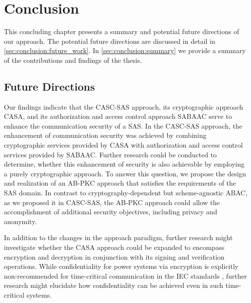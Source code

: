 \chapter{Conclusion}
\label{ch:conclusion}
This concluding chapter presents a summary and potential future directions of our approach.
The potential future directions are discussed in detail in \autoref{sec:conclusion:future_work}.
In \autoref{sec:conclusion:summary} we provide a summary of the contributions and findings of the thesis.

\section{Future Directions}
\label{sec:conclusion:future_work}
Our findings indicate that the CASC-SAS approach, its cryptographic approach CASA, and its authorization and access control approach SABAAC serve to enhance the communication security of a SAS.
In the CASC-SAS approach, the enhancement of communication security was achieved by combining cryptographic services provided by CASA with authorization and access control services provided by SABAAC.
Further research could be conducted to determine, whether this enhancement of security is also achievable by employing a purely cryptographic approach.
To answer this question, we propose the design and realization of an AB-PKC approach that satisfies the requirements of the SAS domain.
In contrast to cryptography-dependent but scheme-agnostic ABAC, as we proposed it in CASC-SAS, the AB-PKC approach could allow the accomplishment of additional security objectives, including privacy and anonymity.

In addition to the changes in the approach paradigm, further research might investigate whether the CASA approach could be expanded to encompass encryption and decryption in conjunction with its signing and verification operations.
While confidentiality for power systems via encryption is explicitly non-recommended for time-critical communication in the IEC standards \cite{IEC62351P6}, further research might elucidate how confidentiality can be achieved even in such time-critical systems.


